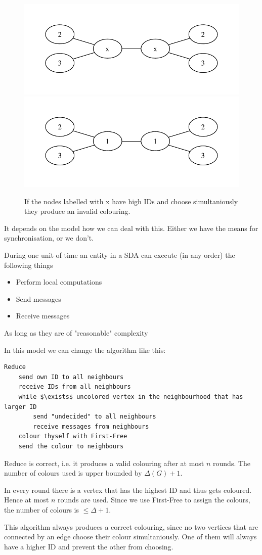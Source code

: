 \begin{figure}
\includegraphics[width=0.5\linewidth]{./images/graph1}
\includegraphics[width=0.5\linewidth]{./images/graph11}
\caption{If the nodes labelled with x have high IDs and choose simultaniously they produce an invalid colouring.}
%
\end{figure}

It depends on the model how we can deal with this. Either we have the means for synchronisation, or we don't.

\begin{Def} During one unit of time an entity in a SDA can execute (in any order) the following things
\begin{itemize}
\item Perform local computations
\item Send messages
\item Receive messages
\end{itemize}

As long as they are of "reasonable" complexity
\end{Def}

In this model we can change the algorithm like this:

\begin{lstlisting}
Reduce
	send own ID to all neighbours
	receive IDs from all neighbours
	while $\exists$ uncolored vertex in the neighbourhood that has larger ID
		send "undecided" to all neighbours
		receive messages from neighbours
	colour thyself with First-Free
	send the colour to neighbours
\end{lstlisting}

\begin{thm} Reduce is correct, i.e. it produces a valid colouring after at most $n$ rounds. The number of colours used is upper bounded by $\Delta(G)+1$. 
\end{thm}

\begin{pr} In every round there is a vertex that has the highest ID and thus gets coloured. Hence at most $n$ rounds are used. Since we use First-Free to assign the colours, the number of colours is $\leq \Delta+1$.

This algorithm always produces a correct colouring, since no two vertices that are connected by an edge choose their colour simultaniously. One of them will always have a higher ID and prevent the other from choosing.
\end{pr}
